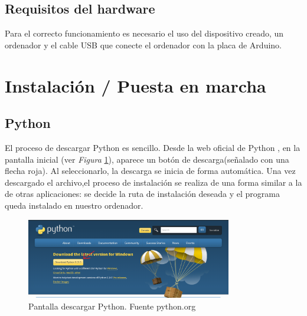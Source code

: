 \subsection{Requisitos del hardware}
Para el correcto funcionamiento es necesario el uso del dispositivo creado, un ordenador y el cable USB que conecte el ordenador con la placa de Arduino.
\section{Instalación / Puesta en marcha}
\subsection{Python}

El proceso de descargar Python es sencillo. Desde la web oficial de Python \cite{Python}, en la pantalla inicial (ver \textit{Figura} \ref{fig:Python}), aparece un botón de descarga(señalado con una flecha roja). Al seleccionarlo, la descarga se inicia de forma  automática. Una vez descargado el archivo,el proceso de instalación se realiza de una forma similar a la de otras aplicaciones: se decide la ruta de instalación deseada y el programa queda instalado en nuestro ordenador.

\begin{figure}[h]
        \centering
        \includegraphics[width=0.8\textwidth]{img/pantalla inicio python.png}
        \caption{Pantalla descargar Python. Fuente python.org }
        \label{fig:Python}
    \end{figure}
